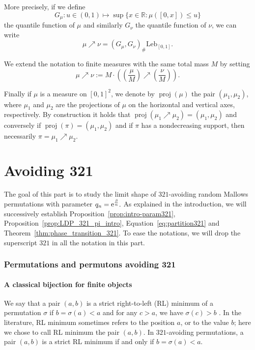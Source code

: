 \documentclass[a4paper,11pt]{amsart}
\newcommand{\ee}{\textup{e}}
\newcommand{\R}{\mathbb R}
\DeclareMathOperator{\proj}{proj}
\theoremstyle{definition}
\begin{document}
More precisely, if we define
\begin{equation}\label{eqn:defn_quantile_function}
    G_\mu : u\in(0,1) \mapsto \sup\{ x\in\R : \mu([0,x]) \le u \}
\end{equation}
the quantile function of $\mu$ and similarly $G_\nu$ the quantile function of $\nu$, %
we can write
\[ \mu \nearrow \nu = (G_\mu, G_\nu)_\# \textrm{Leb}_{[0,1]}. \]

We extend the notation to finite measures with the same total mass $M$
by setting
\[ \mu \nearrow \nu := M \cdot \left( \left( \frac{\mu}{M} \right) \nearrow \left( \frac{\nu}{M} \right) \right) .\]

Finally if $\mu$ is a measure on $[0,1]^2$, we denote by $\proj(\mu)$ the pair $(\mu_1,\mu_2)$,
where $\mu_1$ and $\mu_2$ are the projections of $\mu$ on the horizontal and vertical axes, respectively.
By construction it holds that $\proj(\mu_1 \nearrow \mu_2)=(\mu_1,\mu_2)$ 
and conversely if $\proj(\pi)=(\mu_1,\mu_2)$ and if $\pi$ has a nondecreasing support, 
then necessarily $\pi=\mu_1 \nearrow \mu_2$.


\part{Avoiding 321}
\label{part:321}

The goal of this part is to study the limit shape of $321$-avoiding random Mallows permutations with parameter $q_n = \ee^{\frac{\beta}{n}}.$ As explained in the introduction, we will successively establish Proposition~\ref{prop:intro-param321}, Proposition~\ref{prop:LDP_321_pi_intro}, Equation~\ref{eq:partition321} and Theorem~\ref{thm:phase_transition_321}. 
To ease the notations, we will drop the superscript $321$ in all the notation in this part.


\section{Permutations and permutons avoiding 321}
\label{sec:structure_321}

\subsection{A classical bijection for finite objects}
\label{ssec:bij321}
We say that a pair $(a,b)$ is a strict right-to-left (RL) minimum of a permutation $\sigma$ if $b=\sigma(a)<a$ and for any $c>a$, we have $\sigma(c)>b$ .
In the literature, RL minimum sometimes refers to the position $a$, or to the value $b$;
here we chose to call RL minimum the pair $(a,b)$.
In $321$-avoiding permutations, a pair $(a,b)$ is a strict RL minimum if and only if $b=\sigma(a)<a$.
\end{document}
